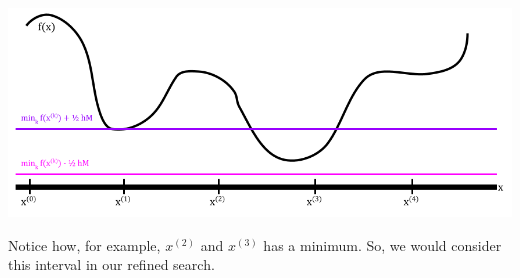 \documentclass[letterpaper]{article}
\begin{document}
\begin{center}
    \includegraphics[scale=0.5]{../assets/1varopt_ex3.png}
\end{center}
Notice how, for example, $x^{(2)}$ and $x^{(3)}$ has a minimum. So, we would consider this interval in our refined search.
\end{document}
